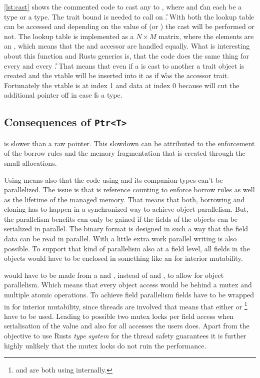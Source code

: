 \documentclass[thesis]{subfiles}
\begin{document}

    \autoref{lst:cast} shows the commented code to cast any \PtrT to , where \T and \U can each be a \struct type or a \trait type.
    The \CastAble trait bound is needed to call  on \U.
    With both \ids the lookup table can be accessed and depending on the value of \OptionT (\SomeT or \None) the cast will be performed or not.
    The lookup table is implemented as a $N \times M$ matrix, where the elements are an , which means that the \struct and accessor \trait are handled equally.
    What is interesting about this function and Rusts generics is, that the code does the same thing for every \T and every \U.
    That means that even if a \struct is cast to another \struct a trait object is created and the vtable will be inserted into it as if \U was the accessor trait.
    Fortunately the vtable is at index 1 and data at index 0 because  will cut the additional pointer off in case \U is a \struct type.

  \subsection{Consequences of \texttt{Ptr<T>}}\label{sec:badptr}
    \PtrT is slower than a raw pointer.
    This slowdown can be attributed to the enforcement of the borrow rules and the memory fragmentation that is created through the small allocations.

    Using \PtrT means also that the code using \PtrT and its companion types can't be parallelized.
    The issue is that \PtrT is reference counting to enforce borrow rules as well as the lifetime of the managed memory.
    That means that both, borrowing and cloning has to happen in a synchronized way to achieve object parallelism.
    But, the parallelism benefits can only be gained if the fields of the objects can be serialized in parallel.
    The binary format is designed in such a way that the field data can be read in parallel.
    With a little extra work parallel writing is also possible.
    To support that kind of parallelism also at a field level, all fields in the objects would have to be enclosed in something like an \UnsafeCellT for interior mutability.

    \PtrT would have to be made from a \ArcT and \RwLockT, instead of \RcT and \RefCellT, to allow for object parallelism.
    Which means that every object access would be behind a mutex and multiple atomic operations\autocite[std::sync::Arc, std::sync::RwLock]{rust-doc}.
    To achieve field parallelism fields have to be wrapped in \UnsafeCellT for interior mutability, since threads are involved that means that either \MutexT or \RwLockT\footnote{
      \MutexT and \RwLockT are both using \UnsafeCellT internally.\autocite[std::sync::Mutex, std::sync::RwLock]{rust-doc}
    } have to be used.
    Leading to possible two mutex locks per field access when serialisation of the value and also for all accesses the users does.
    Apart from the objective to use Rusts \emph{type system} for the thread safety guarantees it is further highly unlikely that the mutex locks do not ruin the performance.
\end{document}

